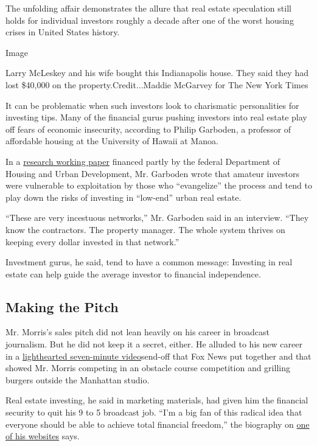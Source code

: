 The unfolding affair demonstrates the allure that real estate
speculation still holds for individual investors roughly a decade after
one of the worst housing crises in United States history.

Image

Larry McLeskey and his wife bought this Indianapolis house. They said
they had lost \$40,000 on the property.Credit...Maddie McGarvey for The
New York Times

It can be problematic when such investors look to charismatic
personalities for investing tips. Many of the financial gurus pushing
investors into real estate play off fears of economic insecurity,
according to Philip Garboden, a professor of affordable housing at the
University of Hawaii at Manoa.

In a \href{https://osf.io/preprints/socarxiv/gucw6/}{research working
paper} financed partly by the federal Department of Housing and Urban
Development, Mr. Garboden wrote that amateur investors were vulnerable
to exploitation by those who ``evangelize'' the process and tend to play
down the risks of investing in ``low-end'' urban real estate.

``These are very incestuous networks,'' Mr. Garboden said in an
interview. ``They know the contractors. The property manager. The whole
system thrives on keeping every dollar invested in that network.''

Investment gurus, he said, tend to have a common message: Investing in
real estate can help guide the average investor to financial
independence.

\hypertarget{making-the-pitch}{%
\subsection{Making the Pitch}\label{making-the-pitch}}

Mr. Morris's sales pitch did not lean heavily on his career in broadcast
journalism. But he did not keep it a secret, either. He alluded to his
new career in a
\href{https://insider.foxnews.com/2017/09/04/clayton-morris-leaving-fox-friends-best-moments-tv}{lighthearted
seven-minute video}send-off that Fox News put together and that showed
Mr. Morris competing in an obstacle course competition and grilling
burgers outside the Manhattan studio.

Real estate investing, he said in marketing materials, had given him the
financial security to quit his 9 to 5 broadcast job. ``I'm a big fan of
this radical idea that everyone should be able to achieve total
financial freedom,'' the biography on
\href{https://www.claytonmorris.com/}{one of his websites} says.


